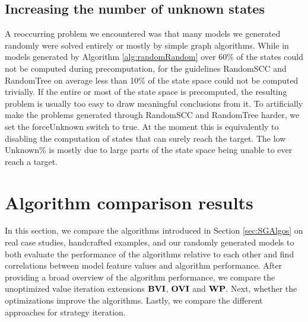 \subsection{Increasing the number of unknown states}
A reoccurring problem we encountered was that many models we generated randomly were solved entirely or mostly by simple graph algorithms.
While in models generated by Algorithm \ref{alg:randomRandom} over 60\% of the states could not be computed during precomputation, 
for the guidelines RandomSCC and RandomTree on average less than 10\% of the state space could not be computed trivially.
If the entire or most of the state space is precomputed, the resulting problem is usually too easy to draw meaningful conclusions from it.
To artificially make the problems generated through RandomSCC and RandomTree harder, we set the forceUnknown switch to true. 
At the moment this is equivalently to disabling the computation of 
states that can surely reach the target.
The low Unknown\% is mostly due to large parts of the state space being unable to ever reach a target.

\section{Algorithm comparison results}
In this section, we compare the algorithms introduced in Section \ref{sec:SGAlgos} on real case studies, handcrafted examples, and our randomly generated models to both evaluate the 
performance of the algorithms relative to each other and find correlations between model feature values and algorithm performance.
After providing a broad overview of the algorithm performance, we compare the unoptimized value iteration extensions $\mathbf{BVI}$, $\mathbf{OVI}$ and $\mathbf{WP}$.
Next, whether the optimizations improve the algorithms. Lastly, we compare the different approaches for strategy iteration. 

